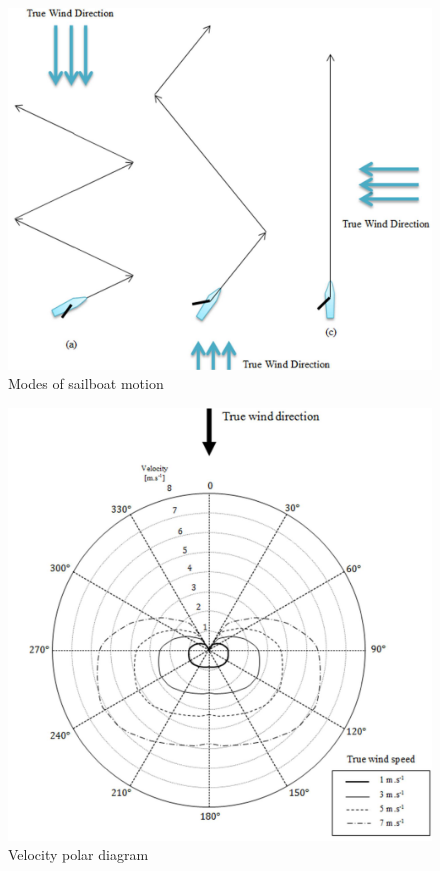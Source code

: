 \documentclass[conference]{IEEEtran}
\begin{document}
\begin{figure}
    \centering
    \includegraphics{documents/figures/alves_modes.png}
    \caption{Modes of sailboat motion \cite{Alves2010}}
    \label{fig:alves_modes}
\end{figure}
\begin{figure}
    \centering
    \includegraphics{documents/figures/alves_vpp.png}
    \caption{Velocity polar diagram \cite{Alves2010}}
    \label{fig:alves_velocity}
\end{figure}
\end{document}
